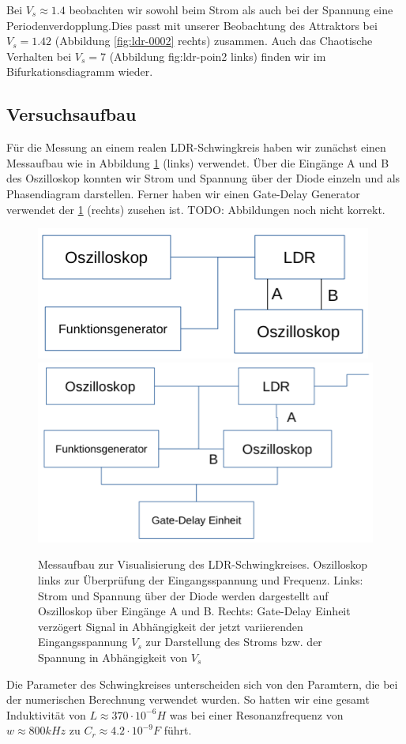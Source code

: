 \documentclass{scrartcl}
\begin{document}
Bei $V_s\approx1.4$ beobachten wir sowohl beim Strom als auch bei der Spannung eine Periodenverdopplung.Dies passt mit unserer Beobachtung des Attraktors bei $V_s=1.42$ (Abbildung \ref{fig:ldr-0002} rechts) zusammen. Auch das Chaotische Verhalten bei $V_s=7$ (Abbildung fig:ldr-poin2 links) finden wir im Bifurkationsdiagramm wieder.

\subsection{ Versuchsaufbau}
Für die Messung an einem realen LDR-Schwingkreis haben wir zunächst einen Messaufbau wie in Abbildung \ref{fig:ldr-aufbau1} (links) verwendet. Über die Eingänge A und B des Oszilloskop konnten wir Strom und Spannung über der Diode einzeln und als Phasendiagram darstellen. Ferner haben wir einen Gate-Delay Generator verwendet der \ref{fig:ldr-aufbau1} (rechts) zusehen ist. TODO: Abbildungen noch nicht korrekt.
\begin{figure}[!htbp]
\includegraphics[scale=0.4]{aufbau1}
\includegraphics[scale=0.38]{aufbau2}
\caption{Messaufbau zur Visualisierung des LDR-Schwingkreises. Oszilloskop links zur Überprüfung der Eingangsspannung und Frequenz. Links: Strom und Spannung über der Diode werden dargestellt auf Oszilloskop über Eingänge A und B. Rechts: Gate-Delay Einheit verzögert Signal in Abhängigkeit der jetzt variierenden Eingangsspannung $V_s$ zur Darstellung des Stroms bzw. der Spannung in Abhängigkeit von $V_s$ }
\label{fig:ldr-aufbau1}
\end{figure}
Die Parameter des Schwingkreises unterscheiden sich von den Paramtern, die bei der numerischen Berechnung verwendet wurden. So hatten wir eine gesamt Induktivität von $L\approx370\cdot10^{-6}H$ was bei einer Resonanzfrequenz von $w\approx800kHz$ zu $C_r\approx4.2\cdot10^{-9}F$ führt.
\end{document}
